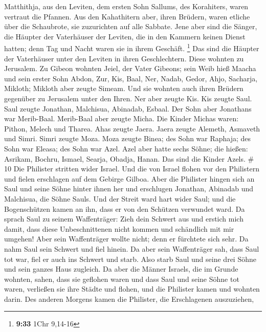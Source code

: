 Matthithja, aus den Leviten, dem ersten Sohn Sallums, des Korahiters,
waren vertraut die Pfannen.  Aus den Kahathitern aber,
ihren Brüdern, waren etliche über die Schaubrote, sie zuzurichten auf
alle Sabbate.  Jene aber sind die Sänger, die Häupter der
Vaterhäuser der Leviten, die in den Kammern keinen Dienst hatten; denn
Tag und Nacht waren sie in ihrem Geschäft. \footnote{\textbf{9:33} 1Chr
  9,14-16}  Das sind die Häupter der Vaterhäuser unter
den Leviten in ihren Geschlechtern. Diese wohnten zu Jerusalem.
 Zu Gibeon wohnten Jeiel, der Vater Gibeons; sein Weib
hieß Maacha  und sein erster Sohn Abdon, Zur, Kis, Baal,
Ner, Nadab,  Gedor, Ahjo, Sacharja, Mikloth;
 Mikloth aber zeugte Simeam. Und sie wohnten auch ihren
Brüdern gegenüber zu Jerusalem unter den Ihren.  Ner aber
zeugte Kis. Kis zeugte Saul. Saul zeugte Jonathan, Malchisua, Abinadab,
Esbaal.  Der Sohn aber Jonathans war Merib-Baal.
Merib-Baal aber zeugte Micha.  Die Kinder Michas waren:
Pithon, Melech und Tharea.  Ahas zeugte Jaera. Jaera
zeugte Alemeth, Asmaveth und Simri. Simri zeugte Moza. 
Moza zeugte Binea; des Sohn war Raphaja; des Sohn war Eleasa; des Sohn
war Azel.  Azel aber hatte sechs Söhne; die hießen:
Asrikam, Bochru, Ismael, Searja, Obadja, Hanan. Das sind die Kinder
Azels. \# 10  Die Philister stritten wider Israel. Und die
von Israel flohen vor den Philistern und fielen erschlagen auf dem
Gebirge Gilboa.  Aber die Philister hingen sich an Saul
und seine Söhne hinter ihnen her und erschlugen Jonathan, Abinadab und
Malchisua, die Söhne Sauls.  Und der Streit ward hart
wider Saul; und die Bogenschützen kamen an ihn, dass er von den Schützen
verwundet ward.  Da sprach Saul zu seinem Waffenträger:
Zieh dein Schwert aus und erstich mich damit, dass diese Unbeschnittenen
nicht kommen und schändlich mit mir umgehen! Aber sein Waffenträger
wollte nicht; denn er fürchtete sich sehr. Da nahm Saul sein Schwert und
fiel hinein.  Da aber sein Waffenträger sah, dass Saul tot
war, fiel er auch ins Schwert und starb.  Also starb Saul
und seine drei Söhne und sein ganzes Haus zugleich.  Da
aber die Männer Israels, die im Grunde wohnten, sahen, dass sie geflohen
waren und dass Saul und seine Söhne tot waren, verließen sie ihre Städte
und flohen, und die Philister kamen und wohnten darin. 
Des anderen Morgens kamen die Philister, die Erschlagenen auszuziehen,
